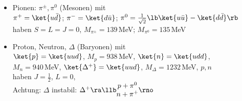 \begin{itemize}
\item Pionen: $\pi^\pm, \pi^0$ (Mesonen) mit\\
$\pi^+ = \ket{u\bar{d}}$; $\pi^-= \ket{d\bar{u}}$; $\pi^0 = \frac{1}{\sqrt{2}} \lb  \ket{u\bar{u}} - \ket{d\bar{d}}\rb  $\\
haben $S=L=J=0$, $M_{\pi^\pm} = 139$\,MeV; $M_{\pi^0} = 135$\,MeV
\item Proton, Neutron, $\Delta$ (Baryonen) mit\\
$\ket{p} = \ket{uud}$, $M_p= 938$\,MeV, $\ket{n}=\ket{udd}$,\\
$M_n = 940$\,MeV, $\ket{\Delta^+} = \ket{uud}$, $M_\Delta = 1232$\,MeV, $p,n$\\
haben $J= \frac{1}{2}$, $ L=0$,\\
Achtung: $\Delta$ instabil: $\Delta^+ \ra \llb \begin{matrix}
p + \pi^0 \\ n +\pi^+
\end{matrix}\rno$
\end{itemize}
